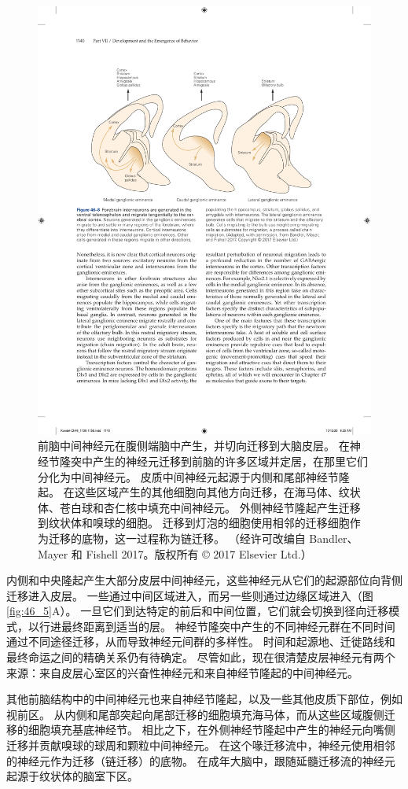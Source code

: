 \begin{figure}[htbp]
	\centering
	\includegraphics[width=0.8\linewidth]{chap46/fig_46_8}
	\caption{前脑中间神经元在腹侧端脑中产生，并切向迁移到大脑皮层。 在神经节隆突中产生的神经元迁移到前脑的许多区域并定居，在那里它们分化为中间神经元。 皮质中间神经元起源于内侧和尾部神经节隆起。 在这些区域产生的其他细胞向其他方向迁移，在海马体、纹状体、苍白球和杏仁核中填充中间神经元。 外侧神经节隆起产生迁移到纹状体和嗅球的细胞。 迁移到灯泡的细胞使用相邻的迁移细胞作为迁移的底物，这一过程称为链迁移。 （经许可改编自 Bandler、Mayer 和 Fishell 2017。版权所有 © 2017 Elsevier Ltd.）}
	\label{fig:46_8}
\end{figure}

内侧和中央隆起产生大部分皮层中间神经元，这些神经元从它们的起源部位向背侧迁移进入皮层。 一些通过中间区域进入，而另一些则通过边缘区域进入（图 \ref{fig:46_5}A）。 一旦它们到达特定的前后和中间位置，它们就会切换到径向迁移模式，以行进最终距离到适当的层。 神经节隆突中产生的不同神经元群在不同时间通过不同途径迁移，从而导致神经元间群的多样性。 时间和起源地、迁徙路线和最终命运之间的精确关系仍有待确定。 尽管如此，现在很清楚皮层神经元有两个来源：来自皮层心室区的兴奋性神经元和来自神经节隆起的中间神经元。

其他前脑结构中的中间神经元也来自神经节隆起，以及一些其他皮质下部位，例如视前区。 从内侧和尾部突起向尾部迁移的细胞填充海马体，而从这些区域腹侧迁移的细胞填充基底神经节。 相比之下，在外侧神经节隆起中产生的神经元向嘴侧迁移并贡献嗅球的球周和颗粒中间神经元。 在这个喙迁移流中，神经元使用相邻的神经元作为迁移（链迁移）的底物。 在成年大脑中，跟随延髓迁移流的神经元起源于纹状体的脑室下区。

